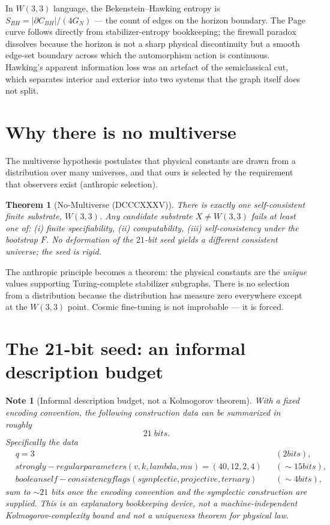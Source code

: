 \documentclass[11pt]{article}
\def\mathcal#1{#1}%
\def\text#1{#1}%
\def\lambda{lambda}%
\def\mu{mu}%
\newtheorem*{theorem}{Theorem}
\newtheorem*{note}{Note}
\begin{document}
In $W(3,3)$ language, the Bekenstein--Hawking entropy is $S_{BH} = |\partial\mathcal{C}_{BH}|/(4G_N)$ --- the count of edges on the horizon boundary. The Page curve follows directly from stabilizer-entropy bookkeeping; the firewall paradox dissolves because the horizon is not a sharp physical discontinuity but a smooth edge-set boundary across which the automorphism action is continuous. Hawking's apparent information loss was an artefact of the semiclassical cut, which separates interior and exterior into two systems that the graph itself does not split.

\section{Why there is no multiverse}

The multiverse hypothesis postulates that physical constants are drawn from a distribution over many universes, and that ours is selected by the requirement that observers exist (anthropic selection).

\begin{theorem}[No-Multiverse (DCCCXXXV)]
There is exactly one self-consistent finite substrate, $W(3,3)$. Any candidate substrate $X \neq W(3,3)$ fails at least one of: (i) finite specifiability, (ii) computability, (iii) self-consistency under the bootstrap $\mathcal{F}$. No deformation of the $21$-bit seed yields a different consistent universe; the seed is rigid.
\end{theorem}

The anthropic principle becomes a theorem: the physical constants are the \emph{unique} values supporting Turing-complete stabilizer subgraphs. There is no selection from a distribution because the distribution has measure zero everywhere except at the $W(3,3)$ point. Cosmic fine-tuning is not improbable --- it is forced.

\section{The 21-bit seed: an informal description budget}

\begin{note}[Informal description budget, not a Kolmogorov theorem]
With a fixed encoding convention, the following construction data can be summarized in roughly
\[
21 \;\text{bits}.
\]
Specifically the data
\begin{align*}
&q = 3 && \text{(2 bits)}, \\
&\text{strongly-regular parameters } (v, k, \lambda, \mu) = (40, 12, 2, 4) && (\sim 15 \text{ bits}), \\
&\text{boolean self-consistency flags (symplectic, projective, ternary)} && (\sim 4 \text{ bits}),
\end{align*}
sum to $\sim 21$ bits once the encoding convention and the symplectic construction are supplied.  This is an explanatory bookkeeping device, not a machine-independent Kolmogorov-complexity bound and not a uniqueness theorem for physical law.
\end{note}
\end{document}

